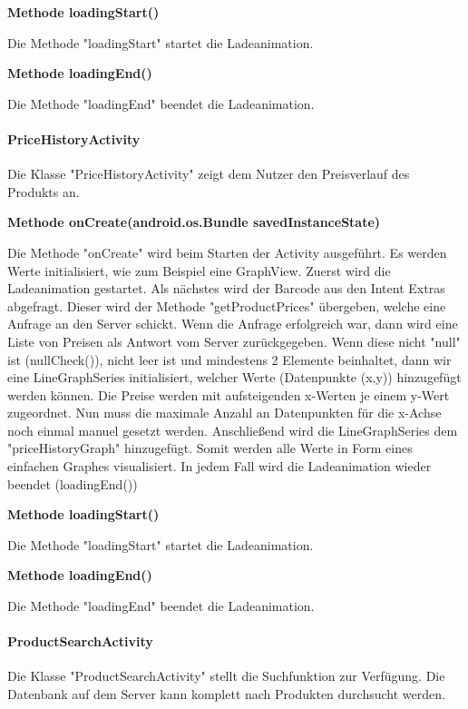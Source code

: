 \documentclass{scrartcl}
\begin{document}
\noindent\textbf{Methode loadingStart()}

\noindent Die Methode "loadingStart" startet die Ladeanimation. \newline

\noindent\textbf{Methode loadingEnd()}

\noindent Die Methode "loadingEnd" beendet die Ladeanimation. \newline

\paragraph{PriceHistoryActivity}
Die Klasse "PriceHistoryActivity" zeigt dem Nutzer den Preisverlauf des Produkts an. \newline 

\noindent\textbf{Methode onCreate(android.os.Bundle savedInstanceState)}

\noindent Die Methode "onCreate" wird beim Starten der Activity ausgeführt. Es werden Werte initialisiert, wie zum Beispiel eine GraphView. Zuerst wird die Ladeanimation gestartet. Als nächstes wird der Barcode aus den Intent Extras abgefragt. Dieser wird der Methode "getProductPrices" übergeben, welche eine Anfrage an den Server schickt. Wenn die Anfrage erfolgreich war, dann wird eine Liste von Preisen als Antwort vom Server zurückgegeben. Wenn diese nicht "null" ist (nullCheck()), nicht leer ist und mindestens 2 Elemente beinhaltet, dann wir eine LineGraphSeries initialisiert, welcher Werte (Datenpunkte (x,y)) hinzugefügt werden können. Die Preise werden mit aufsteigenden x-Werten je einem y-Wert zugeordnet. Nun muss die maximale Anzahl an Datenpunkten für die x-Achse noch einmal manuel gesetzt werden. Anschließend wird die LineGraphSeries dem "priceHistoryGraph" hinzugefügt. Somit werden alle Werte in Form eines einfachen Graphes visualisiert. In jedem Fall wird die Ladeanimation wieder beendet (loadingEnd()) \newline

\noindent\textbf{Methode loadingStart()}

\noindent Die Methode "loadingStart" startet die Ladeanimation. \newline

\noindent\textbf{Methode loadingEnd()}

\noindent Die Methode "loadingEnd" beendet die Ladeanimation. \newline

\paragraph{ProductSearchActivity}
Die Klasse "ProductSearchActivity" stellt die Suchfunktion zur Verfügung. Die Datenbank auf dem Server kann komplett nach Produkten durchsucht werden. \newline 
\end{document}
